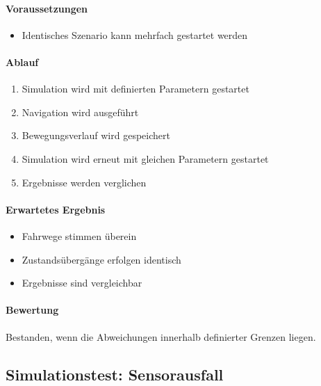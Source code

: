 \documentclass[
  a4paper,
  12pt,
  DIV=12,        %
  parskip=half,  %
  headings=small %
]{scrartcl}
\theoremstyle{definition}
\providecommand{\tightlist}{%
  \setlength{\itemsep}{0pt}\setlength{\parskip}{0pt}}
\theoremstyle{definition}
\begin{document}
\paragraph{Voraussetzungen}\label{voraussetzungen-19}

\begin{itemize}
\tightlist
\item
  Identisches Szenario kann mehrfach gestartet werden
\end{itemize}

\paragraph{Ablauf}\label{ablauf-19}

\begin{enumerate}
\def\labelenumi{\arabic{enumi}.}
\tightlist
\item
  Simulation wird mit definierten Parametern gestartet
\item
  Navigation wird ausgeführt
\item
  Bewegungsverlauf wird gespeichert
\item
  Simulation wird erneut mit gleichen Parametern gestartet
\item
  Ergebnisse werden verglichen
\end{enumerate}

\paragraph{Erwartetes Ergebnis}\label{erwartetes-ergebnis-19}

\begin{itemize}
\tightlist
\item
  Fahrwege stimmen überein
\item
  Zustandsübergänge erfolgen identisch
\item
  Ergebnisse sind vergleichbar
\end{itemize}

\paragraph{Bewertung}\label{bewertung-19}

Bestanden, wenn die Abweichungen innerhalb definierter Grenzen liegen.

\subsection{Simulationstest:
Sensorausfall}\label{simulationstest-sensorausfall}
\end{document}
